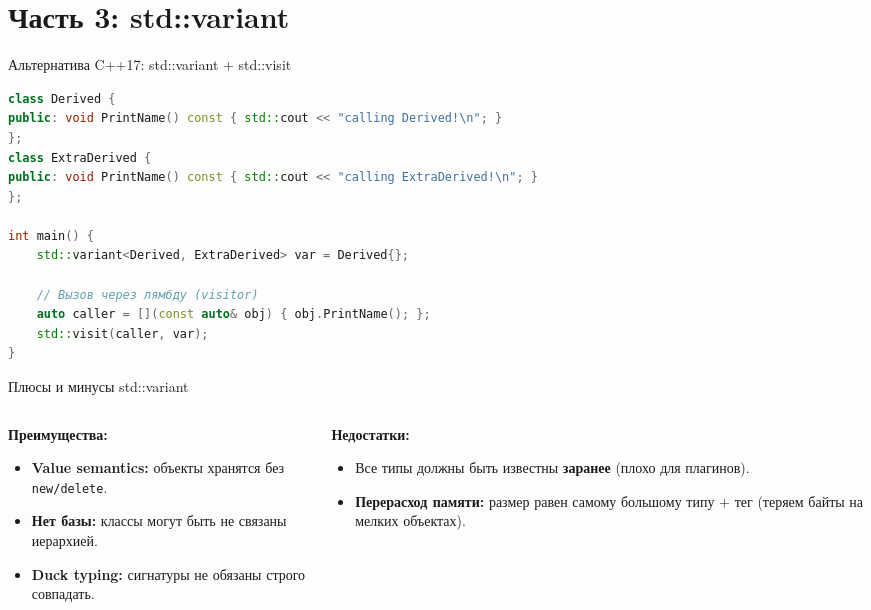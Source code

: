 \documentclass[10pt, aspectratio=169]{beamer}
\begin{document}
\section{Часть 3: std::variant}

\begin{frame}[fragile]{Альтернатива C++17: std::variant + std::visit}
\begin{lstlisting}[language=C++]
class Derived {
public: void PrintName() const { std::cout << "calling Derived!\n"; }
};
class ExtraDerived {
public: void PrintName() const { std::cout << "calling ExtraDerived!\n"; }
};

int main() {
    std::variant<Derived, ExtraDerived> var = Derived{};
    
    // Вызов через лямбду (visitor)
    auto caller = [](const auto& obj) { obj.PrintName(); };
    std::visit(caller, var);
}
\end{lstlisting}
\end{frame}

\begin{frame}{Плюсы и минусы std::variant}
    \begin{columns}[T]
        \begin{column}{0.5\textwidth}
            \textbf{\color{mainblue}Преимущества:}
            \begin{itemize}
                \item \textbf{Value semantics:} объекты хранятся без \texttt{new/delete}.
                \item \textbf{Нет базы:} классы могут быть не связаны иерархией.
                \item \textbf{Duck typing:} сигнатуры не обязаны строго совпадать.
            \end{itemize}
        \end{column}
        
        \begin{column}{0.5\textwidth}
            \textbf{\color{stringred}Недостатки:}
            \begin{itemize}
                \item Все типы должны быть известны \textbf{заранее} (плохо для плагинов).
                \item \textbf{Перерасход памяти:} размер равен самому большому типу + тег (теряем байты на мелких объектах).
            \end{itemize}
        \end{column}
    \end{columns}
\end{frame}
\end{document}
